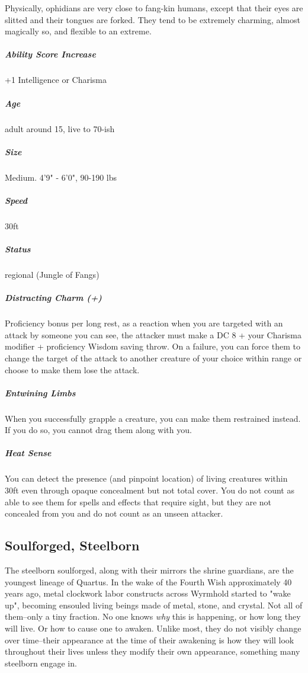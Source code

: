 Physically, ophidians are very close to fang-kin humans, except that their eyes are slitted and their tongues are forked. They tend to be extremely charming, almost magically so, and flexible to an extreme.

\subparagraph*{Ability Score Increase}  +1 Intelligence or Charisma

\subparagraph*{Age}  adult around 15, live to 70-ish

\subparagraph*{Size}  Medium. 4'9" - 6'0", 90-190 lbs

\subparagraph*{Speed}  30ft

\subparagraph*{Status}  regional (Jungle of Fangs)

\subparagraph*{Distracting Charm (+)}  Proficiency bonus per long rest, as a reaction when you are targeted with an attack by someone you can see, the attacker must make a DC 8 + your Charisma modifier + proficiency Wisdom saving throw. On a failure, you can force them to change the target of the attack to another creature of your choice within range or choose to make them lose the attack.

\subparagraph*{Entwining Limbs}  When you successfully grapple a creature, you can make them restrained instead. If you do so, you cannot drag them along with you.

\subparagraph*{Heat Sense}  You can detect the presence (and pinpoint location) of living creatures within 30ft even through opaque concealment but not total cover. You do not count as able to see them for spells and effects that require sight, but they are not concealed from you and do not count as an unseen attacker.

\subsection{Soulforged, Steelborn} \label{lineage:steelborn}

The steelborn soulforged, along with their mirrors the shrine guardians, are the youngest lineage of Quartus. In the wake of the Fourth Wish approximately 40 years ago, metal clockwork labor constructs across Wyrmhold started to "wake up", becoming ensouled living beings made of metal, stone, and crystal. Not all of them--only a tiny fraction. No one knows \textit{why} this is happening, or how long they will live. Or how to cause one to awaken. Unlike most, they do not visibly change over time--their appearance at the time of their awakening is how they will look throughout their lives unless they modify their own appearance, something many steelborn engage in.

